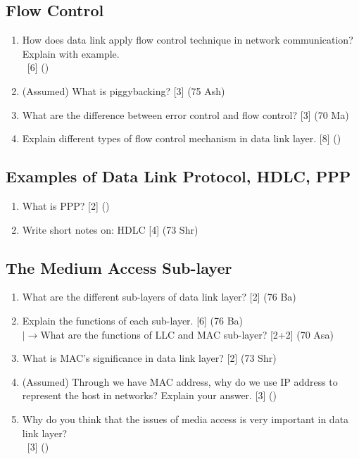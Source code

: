 \documentclass[12pt]{article}
\newcommand{\lb}{\\$\left|\rightarrow\right.$}
\newcommand{\enter}{\\\textcolor{white}{1}}
\begin{document}
	\subsection{Flow Control}
		\begin{enumerate}[noitemsep, topsep=0pt]
			\item How does data link apply flow control technique in network communication? Explain with example.
			\enter\hfill [6] ()

			\item (Assumed) What is piggybacking? \hfill [3] (75 Ash)

			\item What are the difference between error control and flow control? \hfill [3] (70 Ma)

			\item Explain different types of flow control mechanism in data link layer. \hfill [8] ()
		\end{enumerate}

	\subsection{Examples of Data Link Protocol, HDLC, PPP}
		\begin{enumerate}[noitemsep, topsep=0pt]
			\item What is PPP? \hfill[2] ()

			\item Write short notes on: HDLC \hfill [4] (73 Shr)
		\end{enumerate}
	\subsection{The Medium Access Sub-layer}
		\begin{enumerate}[noitemsep, topsep=0pt]
			\item What are the different sub-layers of data link layer? \hfill [2] (76 Ba)

			\item Explain the functions of each sub-layer. \hfill [6] (76 Ba)
			\lb What are the functions of LLC and MAC sub-layer? \hfill [2+2] (70 Asa)

			\item What is MAC's significance in data link layer? \hfill [2] (73 Shr)

			\item (Assumed) Through we have MAC address, why do we use IP address to represent the host in networks? Explain your answer. \hfill [3] ()

			\item Why do you think that the issues of media access is very important in data link layer?
			\enter\hfill [3] ()
		\end{enumerate}
\end{document}
